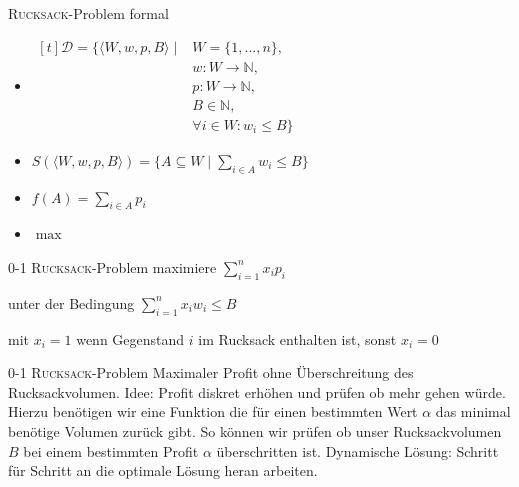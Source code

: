 \begin{frame}{\textsc{Rucksack}-Problem formal}
    \begin{itemize}
        \item $\begin{aligned}[t] \displaystyle
            \mathcal{D}=\{\langle W,w,p,B \rangle \mid & W=\{1,...,n\}, & \\
                                                                & w \colon W \to \mathbb{N}, & \\
                                                                & p \colon W \to \mathbb{N}, & \\
                                                                & B \in \mathbb{N}, & \\
                                                                & \forall i \in W \colon w_i \leq B\}
         \end{aligned}$
        
        \item $\displaystyle S( \langle W, w, p, B \rangle )=\{ A \subseteq W \mid \sum_{i\in A}{ w_i} \leq B \}$
        \item $\displaystyle f(A)=\sum_{i\in A}{p_i}$
        \item $\displaystyle \max$
    \end{itemize}
\end{frame}
\begin{frame}{0-1 \textsc{Rucksack}-Problem}
    maximiere $\displaystyle \sum_{i=1}^{n}{x_i p_i}$
       
    unter der Bedingung $\displaystyle \sum_{i=1}^{n}{x_i w_i \leq B}$
       
    mit $x_i=1$ wenn Gegenstand $i$ im Rucksack enthalten ist, sonst $x_i=0$
\end{frame}
\begin{frame}{0-1 \textsc{Rucksack}-Problem}
    Maximaler Profit ohne Überschreitung des Rucksackvolumen.
    Idee: Profit diskret erhöhen und prüfen ob mehr gehen würde.
    Hierzu benötigen wir eine Funktion die für einen bestimmten Wert $\alpha$ das minimal benötige Volumen zurück gibt.
    So können wir prüfen ob unser Rucksackvolumen $B$ bei einem bestimmten Profit $\alpha$ überschritten ist.
    Dynamische Lösung: Schritt für Schritt an die optimale Lösung heran arbeiten.
\end{frame}
